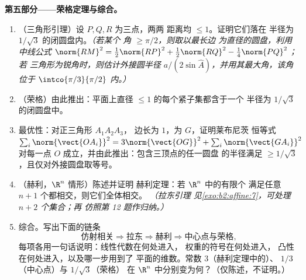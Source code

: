\begin{problem}
\medskip
\noindent\textbf{第五部分——荣格定理与综合。}
\begin{enumerate}[resume]
  \item （三角形引理）设 $P, Q, R$ 为三点，两两
        距离均 $\leq 1$。证明它们落在
        半径为 $1/\sqrt3$ 的闭圆盘内。\emph{（若某个
        角 $\geq \pi/2$，则取以最长边
        为直径的圆盘，利用中线公式
        $\norm{RM}^2 = \tfrac12\norm{RP}^2 +
        \tfrac12\norm{RQ}^2 - \tfrac14\norm{PQ}^2$；若
        三角形为锐角时，则估计外接圆半径 $a/(2\sin
        \widehat A)$，并用其最大角，该角位于
        $\intco{\pi/3}{\pi/2}$ 内。）}
  \item （荣格）由此推出：平面上直径
        $\leq 1$ 的每个紧子集都含于一个
        半径为 $1/\sqrt3$ 的闭圆盘中。
  \item 最优性：对正三角形 $A_1A_2A_3$，
        边长为 $1$，为 $G$，证明莱布尼茨
        恒等式 $\sum_i \norm{\vect{OA_i}}^2 =
        3\norm{\vect{OG}}^2 + \sum_i \norm{\vect{GA_i}}^2$
        对每一点 $O$ 成立，并由此推出：包含三顶点的任一圆盘
        的半径满足 $\geq
        1/\sqrt3$，且仅对外接圆盘取等号。
  \item （赫利，$\R^n$ 情形）陈述并证明
        赫利定理：若 $\R^n$ 中的有限个
        满足任意 $n + 1$ 个都相交，则它们全体相交。
        \emph{（拉东引理
        见\cref{exo:b2:affine:7}，可处理 $n + 2$ 个集合；再
        仿照第 12 题作归纳。）}
  \item 综合。写出下面的链条
        \[
        \text{仿射相关} \Rightarrow \text{拉东}
        \Rightarrow \text{赫利} \Rightarrow
        \text{中心点与荣格},
        \]
        每项各用一句话说明：线性代数在何处进入，
        权重的符号在何处进入，
        凸性在何处进入，以及哪一步用到了
        平面的维数。常数 $3$（赫利定理中的）、
        $1/3$（中心点）与 $1/\sqrt3$（荣格）
        在 $\R^n$ 中分别变为何？（仅陈述，不证明。）
\end{enumerate}
\end{problem}
